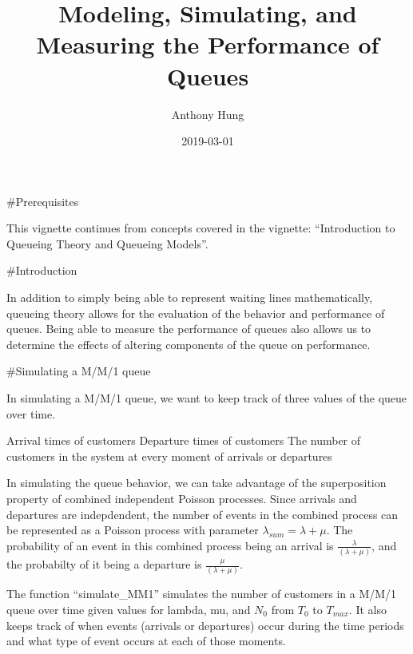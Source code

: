 \documentclass[]{article}
\title{Modeling, Simulating, and Measuring the Performance of Queues}
\author{Anthony Hung}
\date{2019-03-01}
\begin{document}
\maketitle

\#Prerequisites

This vignette continues from concepts covered in the vignette:
``Introduction to Queueing Theory and Queueing Models''.

\#Introduction

In addition to simply being able to represent waiting lines
mathematically, queueing theory allows for the evaluation of the
behavior and performance of queues. Being able to measure the
performance of queues also allows us to determine the effects of
altering components of the queue on performance.

\#Simulating a M/M/1 queue

In simulating a M/M/1 queue, we want to keep track of three values of
the queue over time.

\begin{outline}[enumerate]
   \1 Arrival times of customers
   \1 Departure times of customers
   \1 The number of customers in the system at every moment of arrivals or departures
\end{outline}

In simulating the queue behavior, we can take advantage of the
superposition property of combined independent Poisson processes. Since
arrivals and departures are indepdendent, the number of events in the
combined process can be represented as a Poisson process with parameter
\(\lambda_{sum} = \lambda + \mu\). The probability of an event in this
combined process being an arrival is \(\frac{\lambda}{(\lambda+\mu)}\),
and the probabilty of it being a departure is
\(\frac{\mu}{(\lambda+\mu)}\).

The function ``simulate\_MM1'' simulates the number of customers in a
M/M/1 queue over time given values for lambda, mu, and \(N_0\) from
\(T_0\) to \(T_{max}\). It also keeps track of when events (arrivals or
departures) occur during the time periods and what type of event occurs
at each of those moments.
\end{document}
